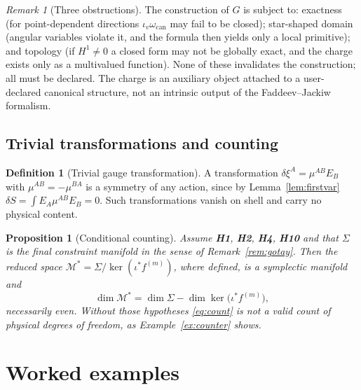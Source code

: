 \documentclass[12pt]{article}
\theoremstyle{plain}
\newtheorem{proposition}[theorem]{Proposition}
\theoremstyle{definition}
\newtheorem{definition}[theorem]{Definition}
\theoremstyle{remark}
\newtheorem{remark}[theorem]{Remark}
\newcommand{\Mm}{\mathcal{M}}
\begin{document}
	\begin{remark}[Three obstructions]
		\label{rem:obstructions}
		The construction of $G$ is subject to: exactness (for point-dependent
		directions $\iota_{v}\omega_{\mathrm{can}}$ may fail to be closed); star-shaped
		domain (angular variables violate it, and the formula then yields only a local
		primitive); and topology (if $H^{1}\neq0$ a closed form may not be globally
		exact, and the charge exists only as a multivalued function). None of these
		invalidates the construction; all must be declared. The charge is an auxiliary
		object attached to a user-declared canonical structure, not an intrinsic output
		of the Faddeev--Jackiw formalism.
	\end{remark}
	
	\subsection{Trivial transformations and counting}
	
	\begin{definition}[Trivial gauge transformation]
		A transformation $\delta\xi^{A}=\mu^{AB}E_{B}$ with $\mu^{AB}=-\mu^{BA}$ is a
		symmetry of any action, since by Lemma~\ref{lem:firstvar}
		$\delta S=\int E_{A}\mu^{AB}E_{B}=0$. Such transformations vanish on shell and
		carry no physical content.
	\end{definition}
	
	\begin{proposition}[Conditional counting]
		\label{prop:counting}
		Assume \textbf{H1}, \textbf{H2}, \textbf{H4}, \textbf{H10} and that $\Sigma$ is
		the final constraint manifold in the sense of Remark~\ref{rem:gotay}. Then the
		reduced space $\Mm^{*}=\Sigma/\ker(\iota^{*}f^{(m)})$, where defined, is a
		symplectic manifold and
		\begin{equation}
			\dim\Mm^{*}=\dim\Sigma-\dim\ker\bigl(\iota^{*}f^{(m)}\bigr),
			\label{eq:count}
		\end{equation}
		necessarily even. Without those hypotheses \eqref{eq:count} is not a valid count
		of physical degrees of freedom, as Example~\ref{ex:counter} shows.
	\end{proposition}
	
	\section{Worked examples}
	\label{sec:examples}
	
\end{document}
